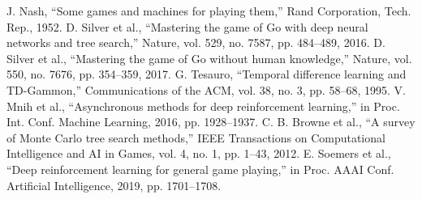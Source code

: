 \documentclass[conference]{IEEEtran}
\begin{document}
\begin{thebibliography}{00}
 J. Nash, ``Some games and machines for playing them,'' Rand Corporation, Tech. Rep., 1952.
 D. Silver et al., ``Mastering the game of Go with deep neural networks and tree search,'' Nature, vol. 529, no. 7587, pp. 484--489, 2016.
 D. Silver et al., ``Mastering the game of Go without human knowledge,'' Nature, vol. 550, no. 7676, pp. 354--359, 2017.
 G. Tesauro, ``Temporal difference learning and TD-Gammon,'' Communications of the ACM, vol. 38, no. 3, pp. 58--68, 1995.
 V. Mnih et al., ``Asynchronous methods for deep reinforcement learning,'' in Proc. Int. Conf. Machine Learning, 2016, pp. 1928--1937.
 C. B. Browne et al., ``A survey of Monte Carlo tree search methods,'' IEEE Transactions on Computational Intelligence and AI in Games, vol. 4, no. 1, pp. 1--43, 2012.
 E. Soemers et al., ``Deep reinforcement learning for general game playing,'' in Proc. AAAI Conf. Artificial Intelligence, 2019, pp. 1701--1708.
\end{thebibliography}
\end{document}
